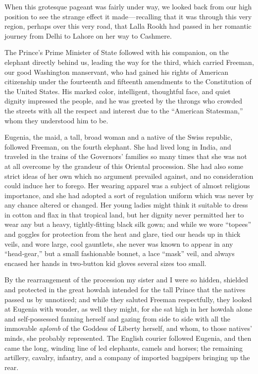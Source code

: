 \documentclass[12pt]{book}
\begin{document}
When this grotesque pageant was fairly under way, we looked back from our
high position to see the strange effect it made — recalling that it was through
this very region, perhaps over this very road, that Lalla Rookh had passed in her
romantic journey from Delhi to Lahore on her way to Cashmere.

The Prince’s Prime Minister of State followed with his companion, on the
elephant directly behind us, leading the way for the third, which carried Freeman,
our good Washington manservant, who had gained his rights of American citizenship under the fourteenth and fifteenth amendments to the Constitution of
the United States. His marked color, intelligent, thoughtful face, and quiet dignity
impressed the people, and he was greeted by the throngs who crowded the streets
with all the respect and interest due to the “American Statesman,” whom they
understood him to be.

Eugenia, the maid, a tall, broad woman and a native of the Swiss republic,
followed Freeman, on the fourth elephant. She had lived long in India, and
traveled in the trains of the Governors’ families so many times that she was not at
all overcome by the grandeur of this Oriental procession. She had also some strict
ideas of her own which no argument prevailed against, and no consideration
could induce her to forego. Her wearing apparel was a subject of almost religious
importance, and she had adopted a sort of regulation uniform which was never
by any chance altered or changed. Her young ladies might think it suitable to
dress in cotton and flax in that tropical land, but her dignity never permitted
her to wear any but a heavy, tightly‐fitting black silk gown; and while we wore
“topees” and goggles for protection from the heat and glare, tied our heads up
in thick veils, and wore large, cool gauntlets, she never was known to appear in
any “head‐gear,” but a small fashionable bonnet, a lace “mask” veil, and always
encased her hands in two‐button kid gloves several sizes too small.

By the rearrangement of the procession my sister and I were so hidden,
shielded and protected in the great howdah intended for the tall Prince that the
natives passed us by unnoticed; and while they saluted Freeman respectfully, they
looked at Eugenia with wonder, as well they might, for she sat high in her howdah
alone and self‐possessed fanning herself and gazing from side to side with all the
immovable {\it aplomb} of the Goddess of Liberty herself, and whom, to those natives’
minds, she probably represented. The English courier followed Eugenia, and then
came the long, winding line of led elephants, camels and horses; the remaining
artillery, cavalry, infantry, and a company of imported bagpipers bringing up the
rear.
\end{document}
